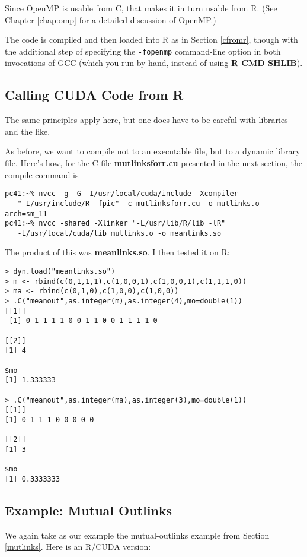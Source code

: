 Since OpenMP is usable from C, that makes it in turn usable from R.
(See Chapter \ref{chap:omp} for a detailed discussion of OpenMP.)

The code is compiled and then loaded into R as in Section
\ref{cfromr}, though with the additional step of specifying the
{\tt -fopenmp} command-line option in both invocations of GCC 
(which you run by hand, instead of using {\bf R CMD SHLIB}).

\subsection{Calling CUDA Code from R}

The same principles apply here, but one does have to be careful with
libraries and the like.

As before, we want to compile not to an executable file, but to a dynamic
library file.  Here's how, for the C file {\bf mutlinksforr.cu}
presented in the next section, the compile command is

\begin{lstlisting}
pc41:~% nvcc -g -G -I/usr/local/cuda/include -Xcompiler 
   "-I/usr/include/R -fpic" -c mutlinksforr.cu -o mutlinks.o -arch=sm_11
pc41:~% nvcc -shared -Xlinker "-L/usr/lib/R/lib -lR" 
   -L/usr/local/cuda/lib mutlinks.o -o meanlinks.so
\end{lstlisting}

The product of this was {\bf meanlinks.so}.  I then tested it on R:

\begin{lstlisting}
> dyn.load("meanlinks.so")
> m <- rbind(c(0,1,1,1),c(1,0,0,1),c(1,0,0,1),c(1,1,1,0))
> ma <- rbind(c(0,1,0),c(1,0,0),c(1,0,0))
> .C("meanout",as.integer(m),as.integer(4),mo=double(1))
[[1]]
 [1] 0 1 1 1 1 0 0 1 1 0 0 1 1 1 1 0

[[2]]
[1] 4

$mo
[1] 1.333333

> .C("meanout",as.integer(ma),as.integer(3),mo=double(1))
[[1]]
[1] 0 1 1 1 0 0 0 0 0

[[2]]
[1] 3

$mo
[1] 0.3333333
\end{lstlisting}

\subsection{Example:  Mutual Outlinks}

We again take as our example the mutual-outlinks example from Section
\ref{mutlinks}.  Here is an R/CUDA version:

